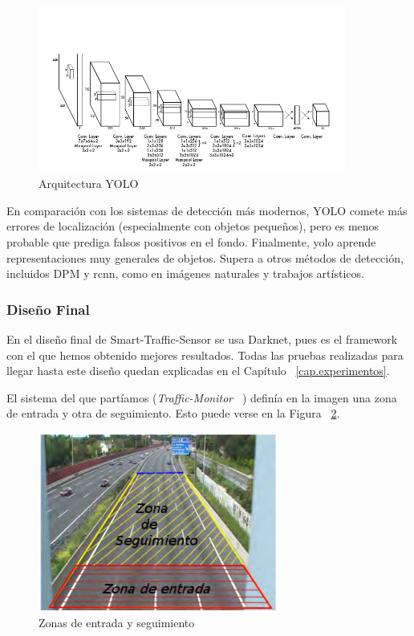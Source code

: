 \begin{figure}[H] 
\begin{center}
	\includegraphics[width=0.9\textwidth]{figures/Diseno_global/yolov3.png}
   \caption{Arquitectura YOLO}
	\label{fig.yolov3}
\end{center}
\end{figure}

En comparación con los sistemas de detección más modernos, YOLO comete más errores de localización (especialmente con objetos pequeños), pero es menos probable que prediga falsos positivos en el fondo. Finalmente, \acrshort{yolo} aprende representaciones muy generales de objetos. Supera a otros métodos de detección, incluidos DPM y \acrshort{rcnn}, como en imágenes naturales y trabajos artísticos.

\subsubsection{Diseño Final}

En el diseño final de Smart-Traffic-Sensor se usa Darknet, pues es el framework con el que hemos obtenido mejores resultados. Todas las pruebas realizadas para llegar hasta este diseño quedan explicadas en el Capítulo ~\ref{cap.experimentos}.

El sistema del que partíamos (\textit{Traffic-Monitor} ~\cite{traffic_monitor_redo}) definía en la imagen una zona de entrada y otra de seguimiento. Esto puede verse en la Figura ~\ref{fig.zonas}.

\begin{figure}[H] 
\begin{center}
	\includegraphics[width=0.7\textwidth]{figures/Diseno_global/zonas.png}
   \caption{Zonas de entrada y seguimiento}
	\label{fig.zonas}
\end{center}
\end{figure}

